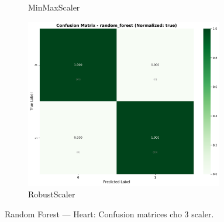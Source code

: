 \begin{figure}[H]
\begin{subfigure}[b]{0.31\textwidth}
\caption{MinMaxScaler}
\label{fig:rf_heart_cm_minmax}
\end{subfigure}\hfill
\begin{subfigure}[b]{0.31\textwidth}
\centering
\includegraphics[width=0.95\textwidth]{Result/heart_dataset/confusion_matrices/random_forest_numeric_dataset_RobustScaler.png}
\caption{RobustScaler}
\label{fig:rf_heart_cm_robust}
\end{subfigure}
\caption{Random Forest — Heart: Confusion matrices cho 3 scaler.}
\label{fig:rf_heart_confusions}
\end{figure}

